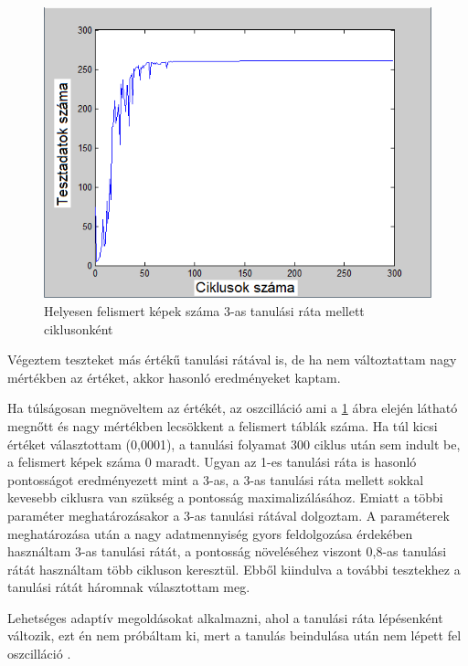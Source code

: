 \begin{figure}[h]
\centering

\includegraphics[scale=0.4]{images/Teszt3_}
\caption{Helyesen felismert képek száma 3-as tanulási ráta mellett ciklusonként}

\label{fig:learningrate2}
\end{figure}

Végeztem teszteket más értékű tanulási rátával is, de ha nem változtattam nagy mértékben az értéket, akkor hasonló eredményeket kaptam.

Ha túlságosan megnöveltem az értékét, az oszcilláció ami a \ref{fig:learningrate2} ábra elején látható megnőtt és nagy mértékben lecsökkent a felismert táblák száma. Ha túl kicsi értéket választottam (0,0001), a tanulási folyamat 300 ciklus után sem indult be, a felismert képek száma 0 maradt. 
Ugyan az 1-es tanulási ráta is hasonló pontosságot eredményezett mint a 3-as, a 3-as tanulási ráta mellett sokkal kevesebb ciklusra van szükség a pontosság maximalizálásához. Emiatt a többi paraméter meghatározásakor a 3-as tanulási rátával dolgoztam. A paraméterek meghatározása után a nagy adatmennyiség gyors feldolgozása érdekében használtam 3-as tanulási rátát, a pontosság növeléséhez viszont 0,8-as tanulási rátát használtam több cikluson keresztül.
Ebből kiindulva a további tesztekhez a tanulási rátát háromnak választottam meg.

Lehetséges adaptív megoldásokat alkalmazni, ahol a tanulási ráta lépésenként változik, ezt én nem próbáltam ki, mert a tanulás beindulása után nem lépett fel oszcilláció \cite{10}. 



